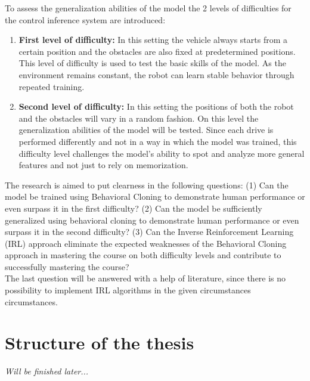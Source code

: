 To assess the generalization abilities of the model the 2 levels of difficulties for the control inference system are introduced:
\begin{enumerate}
  \item \textbf{First level of difficulty:} In this setting the vehicle always starts from a certain position and the obstacles are also fixed at predetermined positions. This level of difficulty is used to test the basic skills of the model. As the environment remains constant, the robot can learn stable behavior through repeated training.
  \item \textbf{Second level of difficulty:} In this setting the positions of both the robot and the obstacles will vary in a random fashion. On this level the generalization abilities of the model will be tested. Since each drive is performed differently and not in a way in which the model was trained, this difficulty level challenges the model's ability to spot and analyze more general features and not just to rely on memorization.
\end{enumerate}

The research is aimed to put clearness in the following questions: (1) Can the model be trained using Behavioral Cloning \autocite{5152385} to demonstrate human performance or even surpass it in the first difficulty? (2) Can the model be sufficiently generalized using behavioral cloning to demonstrate human performance or even surpass it in the second difficulty? (3) Can the Inverse Reinforcement Learning (IRL) \autocite{ng2000algorithms} \autocite{neu2012apprenticeshiplearningusinginverse} \autocites{lee2021approximateinversereinforcementlearning} approach eliminate the expected weaknesses of the Behavioral Cloning approach in mastering the course on both difficulty levels and contribute to successfully mastering the course? \\
The last question will be answered with a help of literature, since there is no possibility to implement IRL algorithms in the given circumstances circumstances.

\section{Structure of the thesis}
\textit{Will be finished later...}
